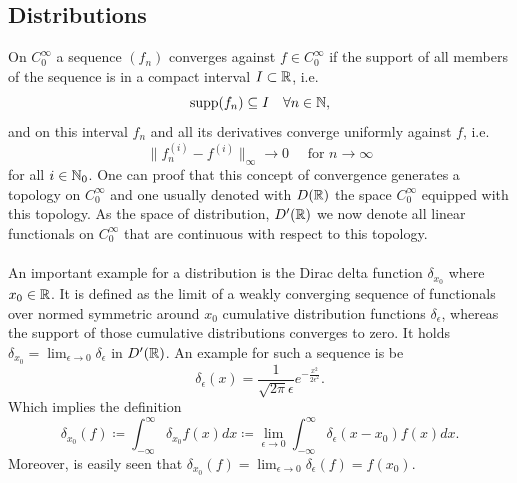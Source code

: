 \subsection*{Distributions}
	On $C_{0}^{\infty}$ a sequence $(f_{n})$ converges against $f \in C_{0}^{\infty}$ if the support of all members of the sequence is in a compact interval $I \subset \mathbb{R}$, i.e.
	$$ \operatorname{supp} (f_{n}) \subseteq I \quad \forall n \in \mathbb{N}, $$
	and on this interval $f_{n}$ and all its derivatives converge uniformly against $f$, i.e.
	\[ \| f_{n}^{(i)} - f^{(i)} \|_{\infty} \rightarrow 0 \quad \text{ for } n \rightarrow \infty \]
	for all $i \in \mathbb{N}_{0}$. One can proof that this concept of convergence generates a topology on $C_{0}^{\infty}$ and one usually denoted with $D(\mathbb{R})$ the space $C_{0}^{\infty}$ equipped with this topology. As the space of distribution, $D'(\mathbb{R})$ we now denote all linear functionals on $C_{0}^{\infty}$ that are continuous with respect to this topology.
~\\ ~\\
An important example for a distribution is the Dirac delta function $\delta_{x_{0}}$ where $x_{0} \in \mathbb{R}$. It is defined as the limit of a weakly converging sequence of functionals over normed symmetric around $x_{0}$ cumulative distribution functions $\delta_{\epsilon}$, whereas the support of those cumulative distributions converges to zero. It holds $\delta_{x_{0}} = \lim_{\epsilon \rightarrow 0} \delta_{\epsilon}$ in $D'(\mathbb{R})$. An example for such a sequence is be
	\[ \delta_{\epsilon}(x) = \frac{1}{\sqrt{2 \pi} \epsilon} e^{-\frac{x^{2}}{2 \epsilon^{2}}}. \]
Which implies the definition
	\[ \delta_{x_{0}}(f) \coloneqq \int_{-\infty}^{\infty} \delta_{x_{0}} f(x) dx \coloneqq \lim_{\epsilon \rightarrow 0} \int_{-\infty}^{\infty} \delta_{\epsilon}(x - x_{0}) f(x) dx. \]
Moreover, is easily seen that $\delta_{x_{0}}(f) = \lim_{\epsilon \rightarrow 0} \delta_{\epsilon}(f) = f(x_{0})$.
